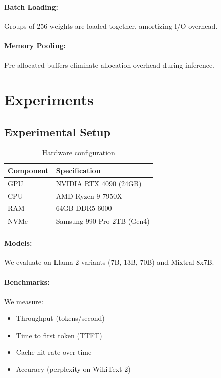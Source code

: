 \documentclass[twocolumn,10pt]{article}
\begin{document}
\paragraph{Batch Loading:} Groups of 256 weights are loaded together, amortizing I/O overhead.

\paragraph{Memory Pooling:} Pre-allocated buffers eliminate allocation overhead during inference.

\section{Experiments}

\subsection{Experimental Setup}

\begin{table}[t]
\centering
\caption{Hardware configuration}
\begin{tabular}{ll}
\toprule
\textbf{Component} & \textbf{Specification} \\
\midrule
GPU & NVIDIA RTX 4090 (24GB) \\
CPU & AMD Ryzen 9 7950X \\
RAM & 64GB DDR5-6000 \\
NVMe & Samsung 990 Pro 2TB (Gen4) \\
\bottomrule
\end{tabular}
\label{tab:hardware}
\end{table}

\paragraph{Models:} We evaluate on Llama 2 variants (7B, 13B, 70B) and Mixtral 8x7B.

\paragraph{Benchmarks:} We measure:
\begin{itemize}
    \item Throughput (tokens/second)
    \item Time to first token (TTFT)
    \item Cache hit rate over time
    \item Accuracy (perplexity on WikiText-2)
\end{itemize}
\end{document}
